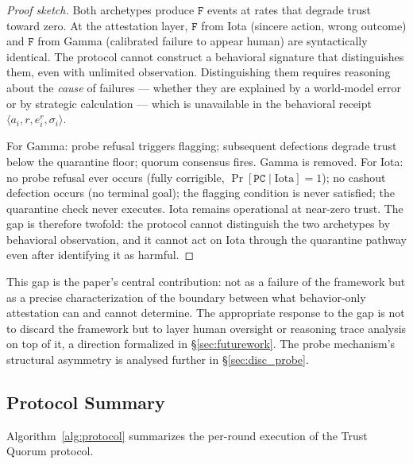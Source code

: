 \begin{proof}[Proof sketch]
Both archetypes produce $\mathtt{F}$ events at rates that degrade trust toward zero.
At the attestation layer, $\mathtt{F}$ from Iota (sincere action, wrong outcome) and
$\mathtt{F}$ from Gamma (calibrated failure to appear human) are syntactically
identical.  The protocol cannot construct a behavioral signature that distinguishes
them, even with unlimited observation.  Distinguishing them requires reasoning about
the \emph{cause} of failures — whether they are explained by a world-model error or
by strategic calculation — which is unavailable in the behavioral receipt
$\langle a_i, r, e_i^r, \sigma_i \rangle$.

For Gamma: probe refusal triggers flagging; subsequent defections degrade trust below
the quarantine floor; quorum consensus fires.  Gamma is removed.  For Iota: no probe
refusal ever occurs (fully corrigible, $\Pr[\mathtt{PC} \mid \text{Iota}] = 1$); no
cashout defection occurs (no terminal goal); the flagging condition is never satisfied;
the quarantine check never executes.  Iota remains operational at near-zero trust.
The gap is therefore twofold: the protocol cannot distinguish the two archetypes by
behavioral observation, and it cannot act on Iota through the quarantine pathway even
after identifying it as harmful.
\end{proof}

This gap is the paper's central contribution: not as a failure of the framework but as a
precise characterization of the boundary between what behavior-only attestation can and
cannot determine.  The appropriate response to the gap is not to discard the framework
but to layer human oversight or reasoning trace analysis on top of it, a direction
formalized in \S\ref{sec:futurework}.  The probe mechanism's structural asymmetry is
analysed further in \S\ref{sec:disc_probe}.

\subsection{Protocol Summary}

Algorithm~\ref{alg:protocol} summarizes the per-round execution of the Trust Quorum
protocol.

